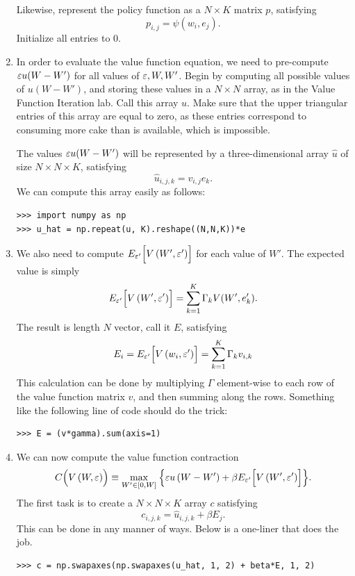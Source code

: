 \begin{problem}
\begin{enumerate}
Likewise, represent the policy function as a $N \times K$ matrix $p$, satisfying
\[
p_{i,j} = \psi(w_i,e_j).
\]
Initialize all entries to 0.

\item In order to evaluate the value function equation, we need to pre-compute $\varepsilon u(W-W')$ for all values of
$\varepsilon,W,W'$.
Begin by computing all possible values of $u(W-W')$, and storing these values in a $N \times N$ array,
as in the Value Function Iteration lab. Call this array $u$. Make sure that the upper triangular
entries of this array are equal to zero, as these entries correspond to consuming more cake than is
available, which is impossible.

The values $\varepsilon u(W-W')$ will be represented by a three-dimensional array $\hat{u}$ of size
$N\times N\times K$, satisfying
\[
\hat{u}_{i,j,k} = v_{i,j}e_k.
\]
We can compute this array easily as follows:

\begin{lstlisting}
>>> import numpy as np
>>> u_hat = np.repeat(u, K).reshape((N,N,K))*e
\end{lstlisting}


\item We also need to compute $E_{\varepsilon'}\Bigl[V\left(W',\varepsilon'\right)\Bigr]$ for each value of $W'$.
The expected value is simply
\begin{equation*}
E_{\varepsilon'}\Bigl[V\left(W',\varepsilon'\right)\Bigr] = \sum_{k=1}^K \Gamma_kV(W',e_k').
\end{equation*}
The result is length $N$ vector, call it $E$, satisfying
\[
E_i = E_{\varepsilon'}\Bigl[V\left(w_i,\varepsilon'\right)\Bigr] = \sum_{k=1}^K \Gamma_kv_{i,k}
\]
This calculation can be done by multiplying $\Gamma$ element-wise to each row of the
value function matrix $v$, and then summing along the rows. Something like the following
line of code should do the trick:
\begin{lstlisting}
>>> E = (v*gamma).sum(axis=1)
\end{lstlisting}

\item We can now compute the value function contraction
\begin{equation*}\label{EqContractStochiid}
C\Bigl(V\left(W,\varepsilon\right)\Bigr) \equiv \max_{W'\in[0,W]}\:
\Bigl\{\varepsilon u\left(W-W'\right) + \beta E_{\varepsilon'}\Bigl[V\left(W',\varepsilon'\right)\Bigr]\Bigr\}.
\end{equation*}
The first task is to create a $N \times N \times K$ array $c$ satisfying
\[
c_{i,j,k} = \hat{u}_{i,j,k} + \beta E_j.
\]
This can be done in any manner of ways. Below is a one-liner that does the job.
\begin{lstlisting}
>>> c = np.swapaxes(np.swapaxes(u_hat, 1, 2) + beta*E, 1, 2)
\end{lstlisting}


\end{enumerate}
\end{problem}
